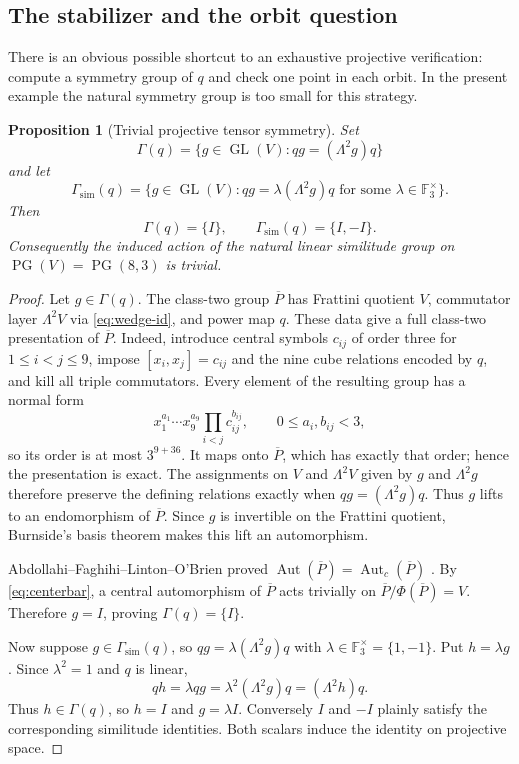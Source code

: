 \documentclass[11pt]{amsart}
\newtheorem{proposition}[theorem]{Proposition}
\theoremstyle{definition}
\theoremstyle{remark}
\newcommand{\F}{\mathbb F}
\newcommand{\Aut}{\operatorname{Aut}}
\newcommand{\PG}{\operatorname{PG}}
\begin{document}
\subsection{The stabilizer and the orbit question}\label{subsec:stabilizer}

There is an obvious possible shortcut to an exhaustive projective
verification: compute a symmetry group of $q$ and check one point in each
orbit.  In the present example the natural symmetry group is too small for
this strategy.

\begin{proposition}[Trivial projective tensor symmetry]\label{prop:stabilizer}
Set
\[
 \Gamma(q)=\{g\in\operatorname{GL}(V):qg=(\Lambda^2g)q\}
\]
and let
\[
 \Gamma_{\mathrm{sim}}(q)=
 \{g\in\operatorname{GL}(V):qg=\lambda(\Lambda^2g)q
       \text{ for some }\lambda\in\F_3^\times\}.
\]
Then
\[
                 \Gamma(q)=\{I\},\qquad
                 \Gamma_{\mathrm{sim}}(q)=\{I,-I\}.
\]
Consequently the induced action of the natural linear similitude group on
$\PG(V)=\PG(8,3)$ is trivial.
\end{proposition}

\begin{proof}
Let $g\in\Gamma(q)$.  The class-two group $\overline P$ has Frattini
quotient $V$, commutator layer $\Lambda^2V$ via
\eqref{eq:wedge-id}, and power map $q$.  These data give a full class-two presentation of $\overline P$.  Indeed,
introduce central symbols $c_{ij}$ of order three for $1\le i<j\le9$,
impose $[x_i,x_j]=c_{ij}$ and the nine cube relations encoded by $q$, and
kill all triple commutators.  Every element of the resulting group has a
normal form
\[
 x_1^{a_1}\cdots x_9^{a_9}
 \prod_{i<j}c_{ij}^{b_{ij}},\qquad
 0\le a_i,b_{ij}<3,
\]
so its order is at most $3^{9+36}$.  It maps onto $\overline P$, which
has exactly that order; hence the presentation is exact.  The assignments
on $V$ and $\Lambda^2V$ given by $g$ and $\Lambda^2g$ therefore preserve
the defining relations exactly when $qg=(\Lambda^2g)q$.  Thus $g$ lifts
to an endomorphism of $\overline P$.  Since $g$ is invertible on the
Frattini quotient, Burnside's basis theorem makes this lift an
automorphism.

Abdollahi--Faghihi--Linton--O'Brien proved
$\Aut(\overline P)=\Aut_c(\overline P)$
\cite[Lemma~3.1, p.~5]{AFLObrien10}.  By \eqref{eq:centerbar}, a central
automorphism of $\overline P$ acts trivially on
$\overline P/\Phi(\overline P)=V$.  Therefore $g=I$, proving
$\Gamma(q)=\{I\}$.

Now suppose $g\in\Gamma_{\mathrm{sim}}(q)$, so
$qg=\lambda(\Lambda^2g)q$ with
$\lambda\in\F_3^\times=\{1,-1\}$.  Put $h=\lambda g$.  Since
$\lambda^2=1$ and $q$ is linear,
\[
 qh=\lambda qg=\lambda^2(\Lambda^2g)q
    =(\Lambda^2h)q.
\]
Thus $h\in\Gamma(q)$, so $h=I$ and $g=\lambda I$.  Conversely $I$
and $-I$ plainly satisfy the corresponding similitude identities.  Both
scalars induce the identity on projective space.
\end{proof}
\end{document}
